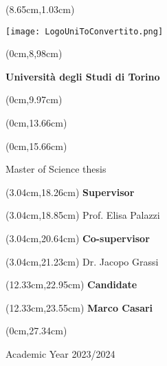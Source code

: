 \documentclass[a4paper,10 pt,titlepage,twoside]{book}
\begin{document}
\frontmatter

\thispagestyle{empty}

\begingroup
\TahomaFont


\begin{textblock*}{4cm}(8.65cm,1.03cm)
	\centerline {\texttt{[image: LogoUniToConvertito.png]}}
\end{textblock*}


\begin{textblock*}{21cm}(0cm,8,98cm)
	\fontsize{18}{22}\selectfont
	\centerline {\textbf{ Universit\`a degli Studi di Torino}}
\end{textblock*}
\begin{textblock*}{21cm}(0cm,9.97cm)
	\fontsize{18}{22}\selectfont
\end{textblock*}


\begin{textblock*}{21cm}(0cm,13.66cm)
	\fontsize{20}{24}\selectfont
\end{textblock*}
\begin{textblock*}{21cm}(0cm,15.66cm)
	\fontsize{18}{22}\selectfont
	\centerline{\Large {Master of Science thesis}}
\end{textblock*}



\fontsize{14}{17}\selectfont

\begin{textblock*}{8cm}(3.04cm,18.26cm)
	\noindent 
	\textbf{Supervisor}
\end{textblock*}
\begin{textblock*}{8cm}(3.04cm,18.85cm)
	\noindent 
	Prof. Elisa Palazzi
\end{textblock*}

\begin{textblock*}{8cm}(3.04cm,20.64cm)
	\noindent 
	\textbf{Co-supervisor}
\end{textblock*}
\begin{textblock*}{8cm}(3.04cm,21.23cm)
	\noindent
	Dr. Jacopo Grassi
\end{textblock*}

\begin{textblock*}{8cm}(12.33cm,22.95cm)
	\noindent
	\textbf{Candidate}
\end{textblock*}
\begin{textblock*}{8cm}(12.33cm,23.55cm)
	\noindent	\textbf{Marco Casari}
\end{textblock*}

\begin{textblock*}{21cm}(0cm,27.34cm)
	\centerline{Academic Year 2023/2024}
\end{textblock*}

\endgroup

\newpage
$ $

\newpage
$ $

\end{document}
